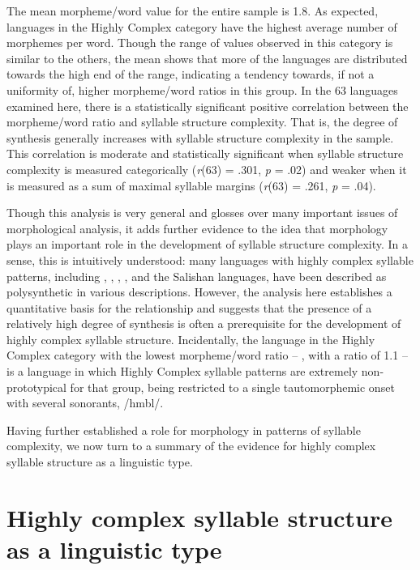   The mean morpheme/word value for the entire sample is 1.8. As expected, languages in the Highly Complex category have the highest average number of morphemes per word. Though the range of values observed in this category is similar to the others, the mean shows that more of the languages are distributed towards the high end of the range, indicating a tendency towards, if not a uniformity of, higher morpheme/word ratios in this group. In the 63 languages examined here, there is a statistically significant positive correlation between the morpheme/word ratio and syllable structure complexity. That is, the degree of synthesis generally increases with syllable structure complexity in the sample. This correlation is moderate and statistically significant when syllable structure complexity is measured categorically (\textit{r}(63) = .301, \textit{p} = .02) and weaker when it is measured as a sum of maximal syllable margins (\textit{r}(63) = .261, \textit{p} = .04).

  Though this analysis is very general and glosses over many important issues of morphological analysis, it adds further evidence to the idea that morphology plays an important role in the development of syllable structure complexity. In a sense, this is intuitively understood: many languages with highly complex syllable patterns, including , , , , and the Salishan languages, have been described as polysynthetic in various descriptions. However, the analysis here establishes a quantitative basis for the relationship and suggests that the presence of a relatively high degree of synthesis is often a prerequisite for the development of highly complex syllable structure. Incidentally, the language in the Highly Complex category with the lowest morpheme/word ratio -- , with a ratio of 1.1 -- is a language in which Highly Complex syllable patterns are extremely non-prototypical for that group, being restricted to a single tautomorphemic onset with several sonorants, /hmbl/.

  Having further established a role for morphology in patterns of syllable complexity, we now turn to a summary of the evidence for highly complex syllable structure as a linguistic type.

\section{Highly complex syllable structure as a linguistic type}\label{sec:8.3}

